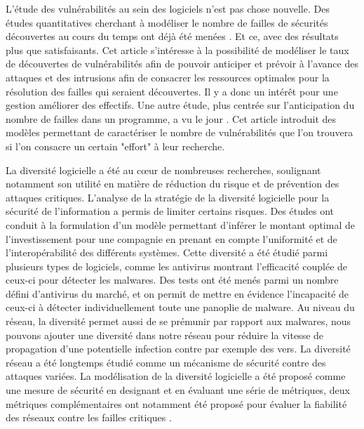 L'étude des vulnérabilités au sein des logiciels n'est pas chose nouvelle. Des études quantitatives cherchant à modéliser le
nombre de failles de sécurités découvertes au cours du temps ont déjà été menées \cite{vulnerabilityDiscovery}. Et ce, avec des
résultats plus que satisfaisants. Cet article s'intéresse à la possibilité de modéliser le taux de découvertes de vulnérabilités
afin de pouvoir anticiper et prévoir à l'avance des attaques et des intrusions afin de consacrer les ressources optimales pour la résolution des failles qui
seraient découvertes. Il y a donc un intérêt pour une gestion améliorer des effectifs. Une autre étude, plus centrée sur l'anticipation du
nombre de failles dans un programme, a vu le jour \cite{assessingVulnerabilities}. Cet article introduit des modèles
permettant de caractériser le nombre de vulnérabilités que l'on trouvera si l'on consacre un certain "effort" à leur recherche.

La diversité logicielle a été au cœur de nombreuses recherches, soulignant notamment son utilité en matière de réduction du risque \cite{softwareDiversityStateOfTheArt} et de prévention des attaques critiques. L'analyse de la stratégie de la diversité logicielle pour la sécurité de l’information a permis de limiter certains risques. Des études ont conduit à la formulation d'un modèle permettant d'inférer le montant optimal de l’investissement pour une compagnie en prenant en compte l’uniformité et de l’interopérabilité des différents systèmes\cite{informationSecurity}. 
Cette diversité a été étudié parmi plusieurs types de logiciels, comme les antivirus \cite{DiversityForSecurityAntivirus}montrant l’efficacité couplée de ceux-ci pour détecter les malwares. Des tests ont été menés parmi un nombre défini d'antivirus du marché, et on permit de mettre en évidence l'incapacité de ceux-ci à détecter individuellement toute une panoplie de malware.
 Au niveau du réseau, la diversité permet aussi de se prémunir par rapport aux malwares, nous pouvons ajouter une diversité dans notre réseau pour réduire la vitesse de propagation d’une potentielle infection \cite{OptimisingNetwork} contre par exemple des vers. La diversité réseau a été longtemps étudié comme un mécanisme de sécurité contre des attaques variées. La modélisation de la diversité logicielle a été proposé comme une mesure de sécurité en designant et en évaluant une série de métriques, deux métriques complémentaires ont notamment été proposé pour évaluer la fiabilité des réseaux contre les failles critiques \cite{networkDiversity}.

